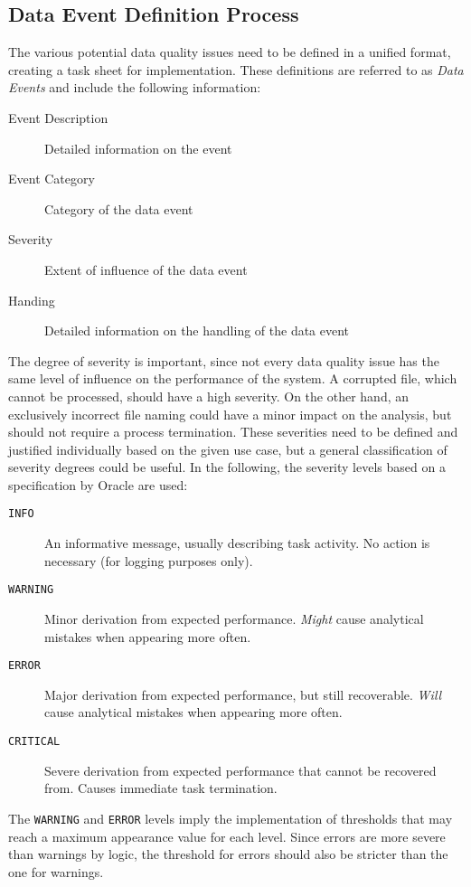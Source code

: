 \subsection{Data Event Definition Process}
The various potential data quality issues need to be defined in a unified format, creating a task sheet for implementation. These definitions are referred to as \textit{Data Events} and include the following information:

\begin{description}
	\item[Event Description] Detailed information on the event
	\item[Event Category] Category of the data event
	\item[Severity] Extent of influence of the data event
	\item[Handing] Detailed information on the handling of the data event
\end{description}

The degree of severity is important, since not every data quality issue has the same level of influence on the performance of the system. A corrupted file, which cannot be processed, should have a high severity. On the other hand, an exclusively incorrect file naming could have a minor impact on the analysis, but should not require a process termination. These severities need to be defined and justified individually based on the given use case, but a general classification of severity degrees could be useful. In the following, the severity levels based on a specification by Oracle \cite{oracle} are used:

\begin{description}
	\item[\texttt{INFO}] An informative message, usually describing task activity. No action is necessary (for logging purposes only).
	\item[\texttt{WARNING}] Minor derivation from expected performance. \textit{Might} cause analytical mistakes when appearing more often.
	\item[\texttt{ERROR}] Major derivation from expected performance, but still recoverable. \textit{Will} cause analytical mistakes when appearing more often.
	\item[\texttt{CRITICAL}] Severe derivation from expected performance that cannot be recovered from. Causes immediate task termination.
\end{description}

The \texttt{WARNING} and \texttt{ERROR} levels imply the implementation of thresholds that may reach a maximum appearance value for each level. Since errors are more severe than warnings by logic, the threshold for errors should also be stricter than the one for warnings.

